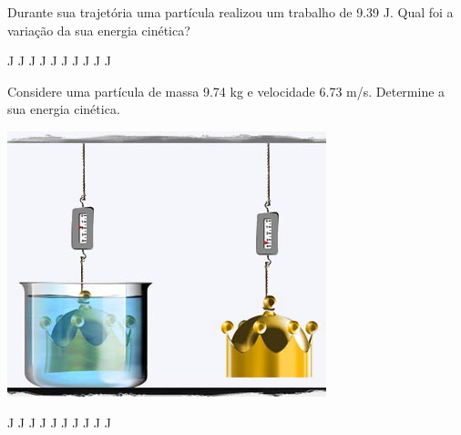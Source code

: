 \documentclass[addpoints]{exam}
\begin{document}
        \begin{questions}
\begin{multicols*}{2}
\question[33] Durante sua trajetória uma partícula realizou um trabalho de    9.39 J. Qual foi a variação da sua energia cinética?

\begin{oneparchoices}
 J J J J J J J J J J\end{oneparchoices}
\question[23] Considere uma partícula de massa    9.74 kg e velocidade    6.73 m/s. Determine a sua energia cinética.

\begin{center}
\begin{minipage}[c]{0.75\linewidth}
\includegraphics[width=\textwidth]{MWE001.jpg}
\end{minipage}

\end{center}
\begin{oneparchoices}
 J J J J J J J J J J\end{oneparchoices}
\end{multicols*}
\end{questions}
\newpage
\end{document}
